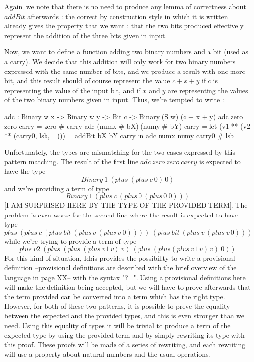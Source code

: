 Again, we note that there is no need to produce any lemma of correctness about $addBit$ afterwards : the correct by construction style in which it is written already gives the property that we want : that the two bits produced effectively represent the addition of the three bits given in input.

Now, we want to define a function adding two binary numbers and a bit (used as a carry). We decide that this addition will only work for two binary numbers expressed with the same number of bits, and we produce a result with one more bit, and this result should of course represent the value $c + x + y$ if $c$ is representing the value of the input bit, and if $x$ and $y$ are representing the values of the two binary numbers given in input. Thus, we're tempted to write :
\begin{code}[caption=Addition of two binary numbers, captionpos=b, label=lst1:haskell2]
adc : Binary w x -> Binary w y -> Bit c 
     -> Binary (S w) (c + x + y)
adc zero zero carry = zero # carry
adc (numx # bX) (numy # bY) carry
   = let (v1 ** (v2 ** (carry0, lsb, _))) = 
      addBit bX bY carry in
          adc numx numy carry0 # lsb
\end{code}
Unfortunately, the types are mismatching for the two cases expressed by this pattern matching. The result of the first line $adc\ zero\ zero\ carry$ is expected to have the type\[Binary\ 1\ (plus\ (plus\ c\ 0)\ 0)\] and we're providing a term of type \[Binary\ 1\ (plus\ c\ (plus\ 0\ (plus\ 0\ 0)))\] [I AM SURPRISED HERE BY THE TYPE OF THE PROVIDED TERM].
The problem is even worse for the second line where the result is expected to have type \[plus\ (plus\ c\ (plus\ bit\ (plus\ v\ (plus\ v\ 0))))\ (plus\ bit\ (plus\ v\ (plus\ v\ 0)))\] while we're trying to provide a term of type \[plus\ v2\ (plus\ (plus\ (plus\ v1\ v)\ v)\ (plus\ (plus (plus\ v1\ v)\ v)\ 0))\]
For this kind of situation, Idris provides the possibility to write a provisional definition --provisional definitions are described with the brief overview of the language in page XX-- with the syntax "?=". Using a provisional definitions here will make the definition being accepted, but we will have to prove afterwards that the term provided can be converted into a term which has the right type.
However, for both of these two patterns, it is possible to prove the equality between the expected and the provided types, and this is even stronger than we need. Using this equality of types it will be trivial to produce a term of the expected type by using the provided term and by simply rewriting its type with this proof. These proofs will be made of a series of rewriting, and each rewriting will use a property about natural numbers and the usual operations.
